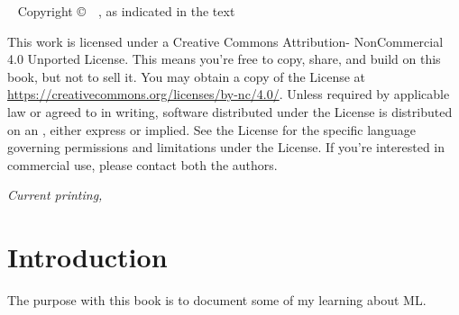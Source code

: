 
\frontmatter

\blankpage


\maketitle


\newpage
\begin{fullwidth}
~\vfill
\thispagestyle{empty}
\setlength{\parindent}{0pt}
\setlength{\parskip}{\baselineskip}
Copyright \copyright\ \the\year\ \thanklessauthor, as indicated in the text


\par{}

\par
This work is licensed under a Creative Commons Attribution-
NonCommercial 4.0 Unported License. This means you’re free to
copy, share, and build on this book, but not to sell it. 
You may obtain a copy
of the License at \url{https://creativecommons.org/licenses/by-nc/4.0/}. Unless
required by applicable law or agreed to in writing, software distributed
under the License is distributed on an , either express or implied. See the
License for the specific language governing permissions and limitations
under the License.
If you’re interested in commercial use, please contact both the authors.

\par\textit{Current printing, \monthyear}
\end{fullwidth}

\tableofcontents

\listoffigures

\listoftables




\mainmatter

\chapter*{Introduction}

The purpose with this book is to document some of my learning about \ac{ML}.

